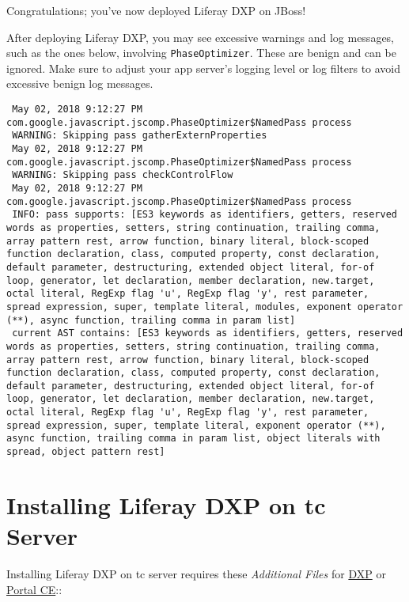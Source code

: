 Congratulations; you've now deployed Liferay DXP on JBoss!

\noindent\hrulefill

After deploying Liferay DXP, you may see excessive warnings and log
messages, such as the ones below, involving \texttt{PhaseOptimizer}.
These are benign and can be ignored. Make sure to adjust your app
server's logging level or log filters to avoid excessive benign log
messages.

\begin{verbatim}
 May 02, 2018 9:12:27 PM com.google.javascript.jscomp.PhaseOptimizer$NamedPass process
 WARNING: Skipping pass gatherExternProperties
 May 02, 2018 9:12:27 PM com.google.javascript.jscomp.PhaseOptimizer$NamedPass process
 WARNING: Skipping pass checkControlFlow
 May 02, 2018 9:12:27 PM com.google.javascript.jscomp.PhaseOptimizer$NamedPass process
 INFO: pass supports: [ES3 keywords as identifiers, getters, reserved words as properties, setters, string continuation, trailing comma, array pattern rest, arrow function, binary literal, block-scoped function declaration, class, computed property, const declaration, default parameter, destructuring, extended object literal, for-of loop, generator, let declaration, member declaration, new.target, octal literal, RegExp flag 'u', RegExp flag 'y', rest parameter, spread expression, super, template literal, modules, exponent operator (**), async function, trailing comma in param list]
 current AST contains: [ES3 keywords as identifiers, getters, reserved words as properties, setters, string continuation, trailing comma, array pattern rest, arrow function, binary literal, block-scoped function declaration, class, computed property, const declaration, default parameter, destructuring, extended object literal, for-of loop, generator, let declaration, member declaration, new.target, octal literal, RegExp flag 'u', RegExp flag 'y', rest parameter, spread expression, super, template literal, exponent operator (**), async function, trailing comma in param list, object literals with spread, object pattern rest]
\end{verbatim}

\section{Installing Liferay DXP on tc
Server}\label{installing-liferay-dxp-on-tc-server}

Installing Liferay DXP on tc server requires these \emph{Additional
Files} for \href{https://help.liferay.com/hc}{DXP} or
\href{https://www.liferay.com/downloads-community}{Portal CE}::

